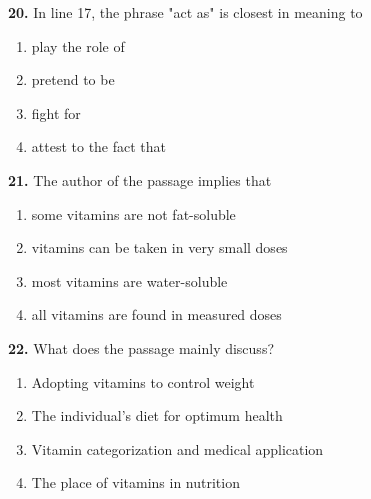 \documentclass[12pt]{article}
\begin{document}
\par
\vspace{0.25\baselineskip}
\noindent\textbf{20.} In line 17, the phrase "act as" is closest in meaning to
\begin{enumerate}[label=(\Alph*),leftmargin=*,itemsep=0.2em]
\item play the role of
\item pretend to be
\item fight for
\item attest to the fact that
\end{enumerate}
\par
\vspace{0.25\baselineskip}
\noindent\textbf{21.} The author of the passage implies that
\begin{enumerate}[label=(\Alph*),leftmargin=*,itemsep=0.2em]
\item some vitamins are not fat-soluble
\item vitamins can be taken in very small doses
\item most vitamins are water-soluble
\item all vitamins are found in measured doses
\end{enumerate}
\par
\vspace{0.25\baselineskip}
\noindent\textbf{22.} What does the passage mainly discuss?
\begin{enumerate}[label=(\Alph*),leftmargin=*,itemsep=0.2em]
\item Adopting vitamins to control weight
\item The individual's diet for optimum health
\item Vitamin categorization and medical application
\item The place of vitamins in nutrition
\end{enumerate}
\par
\vspace{0.25\baselineskip}
\end{document}
